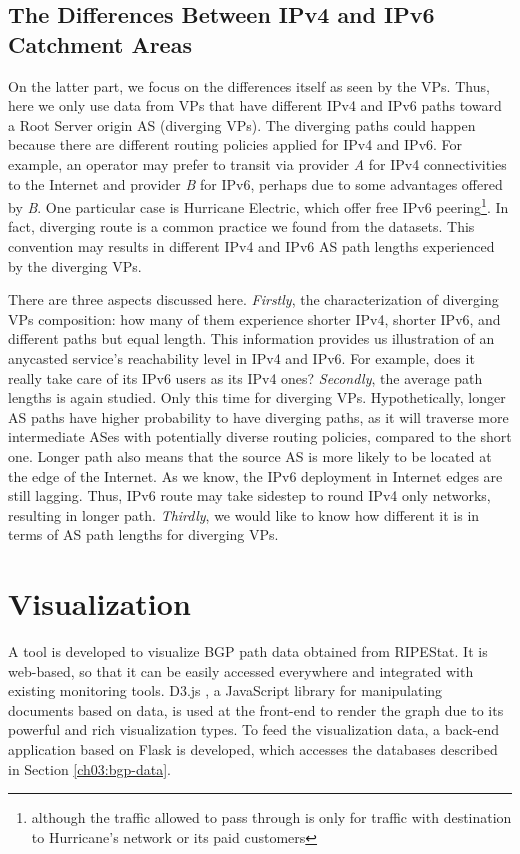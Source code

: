 \subsection{The Differences Between IPv4 and IPv6 Catchment Areas}
\label{ch03:analysis:diff}
On the latter part, we focus on the differences itself as seen by the VPs. Thus, here we only use data from VPs that have different IPv4 and IPv6 paths toward a Root Server origin AS (diverging VPs). The diverging paths could happen because there are different routing policies applied for IPv4 and IPv6. For example, an operator may prefer to transit via provider \textit{A} for IPv4 connectivities to the Internet and provider \textit{B} for IPv6, perhaps due to some advantages offered by \textit{B}. One particular case is Hurricane Electric, which offer free IPv6 peering\footnote{although the traffic allowed to pass through is only for traffic with destination to Hurricane's network or its paid customers}. In fact, diverging route is a common practice we found from the datasets. This convention may results in different IPv4 and IPv6 AS path lengths experienced by the diverging VPs.

There are three aspects discussed here. \textit{Firstly}, the characterization of diverging VPs composition: how many of them experience shorter IPv4, shorter IPv6, and different paths but equal length. This information provides us illustration of an anycasted service's reachability level in IPv4 and IPv6. For example, does it really take care of its IPv6 users as its IPv4 ones? 
\textit{Secondly}, the average path lengths is again studied. Only this time for diverging VPs. Hypothetically, longer AS paths have higher probability to have diverging paths, as it will traverse more intermediate ASes with potentially diverse routing policies, compared to the short one. Longer path also means that the source AS is more likely to be located at the edge of the Internet. As we know, the IPv6 deployment in Internet edges are still lagging. Thus, IPv6 route may take sidestep to round IPv4 only networks, resulting in longer path. \textit{Thirdly}, we would like to know how different it is in terms of AS path lengths for diverging VPs. 

\section{Visualization}
\label{ch03:visualization}

A tool is developed to visualize BGP path data obtained from RIPEStat. It is web-based, so that it can be easily accessed everywhere and integrated with existing monitoring tools. D3.js \cite{d3js}, a JavaScript library for manipulating documents based on data, is used at the front-end to render the graph due to its powerful and rich visualization types. To feed the visualization data, a back-end application based on Flask is developed, which accesses the databases described in Section \ref{ch03:bgp-data}.

